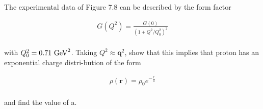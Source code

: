 \begin{problem}{7.8}
    The experimental data of Figure 7.8 can be described by the form factor

    \begin{align*}
        G(Q^2)= \frac{G(0)}{\left( 1+Q^2/Q_0^2 \right)^2}
    \end{align*}\\
    with $Q_0^2 = 0.71 \text{ GeV}^2$. Taking $Q^2 \approx \mathbf{q}^2$, show that this implies that proton has an exponential charge distri-bution of the form

    \begin{align*}
        \rho(\mathbf{r}) = \rho_0 e^{-\frac{r}{a}}
    \end{align*}\\
    and find the value of a.
\end{problem}
